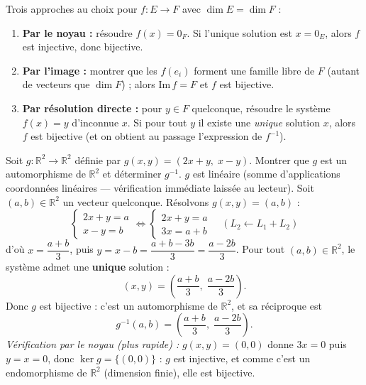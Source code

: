 \documentclass[11pt]{article}
\newcommand{\cle}[1]{{\popxbold\color{popdark}#1}}
\begin{document}
\begin{methode}
Trois approches au choix pour $f : E \to F$ avec $\dim E = \dim F$ :
\begin{enumerate}
\item \textbf{Par le noyau :} résoudre $f(x) = 0_F$. Si l'unique solution est $x = 0_E$, alors $f$ est injective, donc bijective.
\item \textbf{Par l'image :} montrer que les $f(e_i)$ forment une famille libre de $F$ (autant de vecteurs que $\dim F$) ; alors $\mathrm{Im}\,f = F$ et $f$ est bijective.
\item \textbf{Par résolution directe :} pour $y \in F$ quelconque, résoudre le système $f(x) = y$ d'inconnue $x$. Si pour tout $y$ il existe une \emph{unique} solution $x$, alors $f$ est bijective (et on obtient au passage l'expression de $f^{-1}$).
\end{enumerate}
\end{methode}

\begin{exoresolu}[Bijectivité par résolution directe du système $f(x) = y$]
Soit $g : \mathbb{R}^2 \to \mathbb{R}^2$ définie par $g(x,y) = (2x + y,\; x - y)$. Montrer que $g$ est un automorphisme de $\mathbb{R}^2$ et déterminer $g^{-1}$.
\tcblower
$g$ est linéaire (somme d'applications coordonnées linéaires — vérification immédiate laissée au lecteur). Soit $(a,b) \in \mathbb{R}^2$ un vecteur quelconque. Résolvons $g(x,y) = (a,b)$ :
\[ \begin{cases} 2x + y = a \\ x - y = b \end{cases} \iff \begin{cases} 2x + y = a \\ 3x = a + b \end{cases} \quad (L_2 \leftarrow L_1 + L_2) \]
d'où $x = \dfrac{a+b}{3}$, puis $y = x - b = \dfrac{a + b - 3b}{3} = \dfrac{a - 2b}{3}$.
Pour tout $(a,b) \in \mathbb{R}^2$, le système admet une \textbf{unique} solution :
\[ (x,y) = \left(\dfrac{a+b}{3},\; \dfrac{a - 2b}{3}\right). \]
Donc $g$ est bijective : c'est un \cle{automorphisme} de $\mathbb{R}^2$, et sa réciproque est
\[ g^{-1}(a,b) = \left(\dfrac{a+b}{3},\; \dfrac{a-2b}{3}\right). \]
\emph{Vérification par le noyau (plus rapide) :} $g(x,y) = (0,0)$ donne $3x = 0$ puis $y = x = 0$, donc $\ker g = \{(0,0)\}$ : $g$ est injective, et comme c'est un endomorphisme de $\mathbb{R}^2$ (dimension finie), elle est bijective.
\end{exoresolu}
\end{document}
